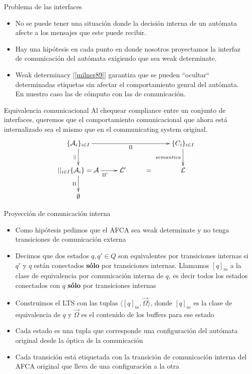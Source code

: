 \documentclass[10pt,xcolor={table,dvipsnames},t]{beamer}
\begin{document}
\begin{frame}{Problema de las interfaces}
\begin{itemize}
\item No se puede tener una situación donde la decisión interna de un autómata afecte a los mensajes que este puede recibir.
\item Hay una hipótesis en cada punto en donde nosotros proyectamos la interfaz de comunicación del autómata exigiendo que sea weak determinate.
\item Weak determinacy [\ref{milner89}] garantiza que se pueden ``ocultar`` determinadas etiquetas sin afectar el comportamiento genral del autómata. En nuestro caso las de cómputo con las de comunicación.
\end{itemize} 
\vspace{\fill}
\end{frame}

\begin{frame}{Equivalencia comunicacional}
 \vspace{\fill}
Al chequear compliance entre un conjunto de interfaces, queremos que el comportamiento comunicacional que ahora está internalizado sea el mismo que en el communicating system original. 
$$
\xymatrix{   
	\{\mathcal{A}_i\}_{i \in I} \ar[rrr]_{\Pi} \ar[d]_{||} & & & \{C_i\}_{i \in I}  \ar[d]_{semantica}  \\
	  {||_{i \in I}\{\mathcal{A}_i\}= \mathcal{A}} \ar[r]_{\ \ \ \ \Pi'} \ar[d]_{\Pi} & \mathcal{L}' & = & {\mathcal{L}}  \\
	  \emptyset
}
$$
 \vspace{\fill}
\end{frame}

\begin{frame}{Proyección de comunicación interna}
 \vspace{\fill}
\begin{itemize}
    \item Como hipótesis pedimos que el AFCA sea weak determinate y no tenga transiciones de comunicación externa
    \item Decimos que dos estados $q, q' \in Q$ son equivalentes por transiciones internas si $q'$ y $q$ están conectados \textbf{sólo} por transiciones internas. Llamamos $[q]_m$ a la clase de equivalencia por comunicación interna de $q$, es decir todos los estados conectados con $q$ \textbf{sólo} por transiciones internas 
    \item Construimos el LTS con las tuplas $\langle [q]_m, \overrightarrow{\Omega} \rangle$, donde $[q]_m$ es la clase de equivalencia de $q$ y $\overrightarrow{\Omega}$ es el contenido de los buffers para ese estado
    \item Cada estado es una tupla que corresponde una configuración del autómata original desde la óptica de la comunicación
    \item Cada transición está etiquetada con la transición de comunicación interna del AFCA original que lleva de una configuración a la otra
\end{itemize}
 \vspace{\fill}

\end{frame}
\end{document}

